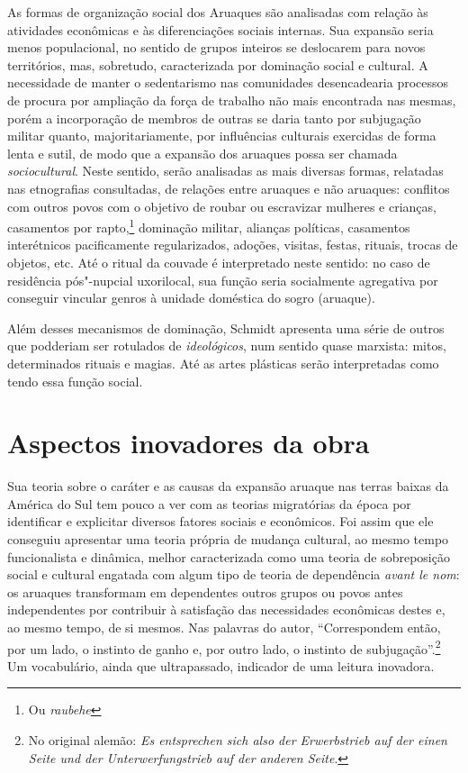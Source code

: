 As formas de organização social dos Aruaques são analisadas com relação às atividades econômicas e às diferenciações sociais internas. Sua expansão seria menos populacional, no sentido de grupos inteiros se deslocarem para novos territórios, mas, sobretudo, caracterizada por dominação social e cultural. A necessidade de manter o sedentarismo nas comunidades desencadearia processos de procura por ampliação da força de trabalho não mais encontrada nas mesmas, porém a incorporação de membros de outras se daria tanto por subjugação militar quanto, majoritariamente, por influências culturais exercidas de forma lenta e sutil, de modo que a expansão dos aruaques possa ser chamada \textit{sociocultural}. Neste sentido, serão analisadas as mais diversas formas, relatadas nas etnografias consultadas, de relações entre aruaques e não aruaques: conflitos com outros povos com o objetivo de roubar ou escravizar mulheres e crianças, casamentos por rapto,\footnote{Ou \textit{raubehe}} dominação militar, alianças políticas, casamentos interétnicos pacificamente regularizados, adoções, visitas, festas, rituais, trocas de objetos, etc. Até o ritual da couvade é interpretado neste sentido: no caso de residência pós"-nupcial uxorilocal, %
sua função seria socialmente agregativa por conseguir vincular genros à unidade doméstica do sogro (aruaque).

Além desses mecanismos de dominação, Schmidt apresenta uma série de
outros que podderiam ser rotulados de \textit{ideológicos}, num sentido quase
marxista: mitos, determinados rituais e magias. Até as artes plásticas
serão interpretadas como tendo essa função social.

\section{Aspectos inovadores da obra}

Sua teoria sobre o caráter e as causas da expansão aruaque nas
terras baixas da América do Sul tem pouco a ver com as teorias
migratórias da época por identificar e explicitar diversos fatores
sociais e econômicos. Foi assim que ele conseguiu apresentar uma teoria
própria de mudança cultural, ao mesmo tempo funcionalista e dinâmica, melhor 
caracterizada como uma teoria de sobreposição
social e cultural engatada com algum tipo de teoria de dependência
\textit{avant le nom}: os aruaques transformam em dependentes outros
grupos ou povos antes independentes por contribuir à satisfação das
necessidades econômicas destes e, ao mesmo tempo, de si mesmos. Nas palavras do autor, 
``Correspondem então, por um lado, o instinto de
ganho e, por outro lado, o instinto de subjugação''.\footnote{No original alemão: \textit{Es entsprechen sich also der Erwerbstrieb auf der einen Seite und der
Unterwerfungstrieb auf der anderen Seite}.} Um vocabulário,
ainda que ultrapassado, indicador de uma leitura inovadora.

